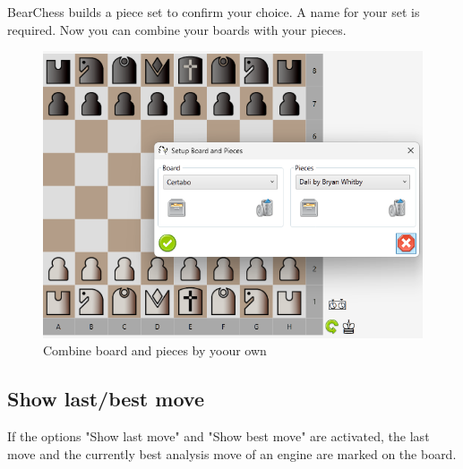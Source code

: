 \documentclass[11pt,a4paper]{article}
\begin{document}
	BearChess builds a piece set to confirm your choice. A name for your set is required.
	Now you can combine your boards with your pieces.
	
	\begin{figure}[H]
		\centering
		\includegraphics[scale=0.7]{CombineBoardPieces.png}
		\caption{Combine board and pieces by yoour own }
		\label{fig:CombineBoardPieces}
	\end{figure}
	
	\subsection{Show last/best move}
	If the options "Show last move" and "Show best move" are activated, the last move and the currently best analysis move of an engine are marked on the board.
	
\end{document}
